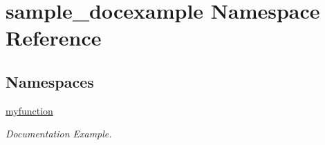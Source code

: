 \hypertarget{namespacesample__docexample}{\section{sample\-\_\-docexample Namespace Reference}
\label{namespacesample__docexample}
}
\subsection*{Namespaces}
\begin{DoxyCompactItemize}
\item 
\hyperlink{namespacesample__docexample_1_1myfunction}{myfunction}
\begin{DoxyCompactList}\small\item\em Documentation Example. \end{DoxyCompactList}\end{DoxyCompactItemize}
